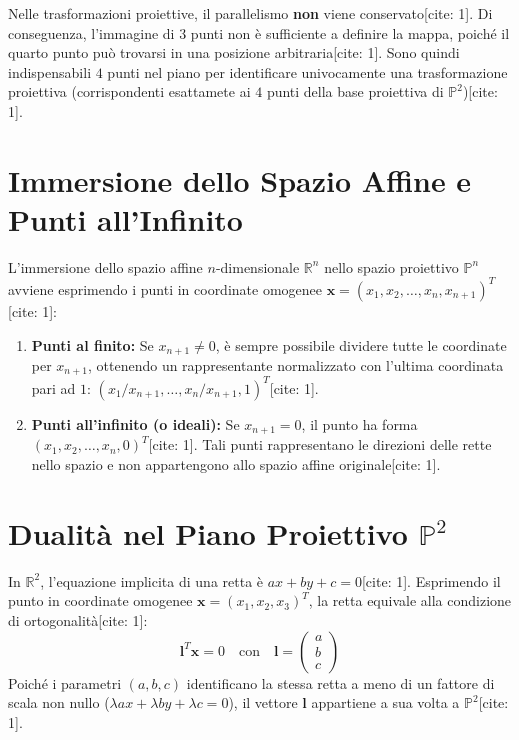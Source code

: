 Nelle trasformazioni proiettive, il parallelismo \textbf{non} viene conservato[cite: 1]. Di conseguenza, l'immagine di $3$ punti non è sufficiente a definire la mappa, poiché il quarto punto può trovarsi in una posizione arbitraria[cite: 1]. Sono quindi indispensabili $4$ punti nel piano per identificare univocamente una trasformazione proiettiva (corrispondenti esattamete ai $4$ punti della base proiettiva di $\mathbb{P}^2$)[cite: 1].

\section{Immersione dello Spazio Affine e Punti all'Infinito}
L'immersione dello spazio affine $n$-dimensionale $\mathbb{R}^n$ nello spazio proiettivo $\mathbb{P}^n$ avviene esprimendo i punti in coordinate omogenee $\mathbf{x} = (x_1, x_2, \dots, x_n, x_{n+1})^T$[cite: 1]:
\begin{enumerate}
    \item \textbf{Punti al finito:} Se $x_{n+1} \neq 0$, è sempre possibile dividere tutte le coordinate per $x_{n+1}$, ottenendo un rappresentante normalizzato con l'ultima coordinata pari ad $1$: $(x_1/x_{n+1}, \dots, x_n/x_{n+1}, 1)^T$[cite: 1].
    \item \textbf{Punti all'infinito (o ideali):} Se $x_{n+1} = 0$, il punto ha forma $(x_1, x_2, \dots, x_n, 0)^T$[cite: 1]. Tali punti rappresentano le direzioni delle rette nello spazio e non appartengono allo spazio affine originale[cite: 1].
\end{enumerate}

\section{Dualità nel Piano Proiettivo $\mathbb{P}^2$}
In $\mathbb{R}^2$, l'equazione implicita di una retta è $ax + by + c = 0$[cite: 1]. Esprimendo il punto in coordinate omogenee $\mathbf{x} = (x_1, x_2, x_3)^T$, la retta equivale alla condizione di ortogonalità[cite: 1]:
\begin{equation}
\mathbf{l}^T \mathbf{x} = 0 \quad \text{con} \quad \mathbf{l} = \begin{pmatrix} a \\ b \\ c \end{pmatrix}
\end{equation}
Poiché i parametri $(a, b, c)$ identificano la stessa retta a meno di un fattore di scala non nullo ($\lambda a x + \lambda b y + \lambda c = 0$), il vettore $\mathbf{l}$ appartiene a sua volta a $\mathbb{P}^2$[cite: 1].

